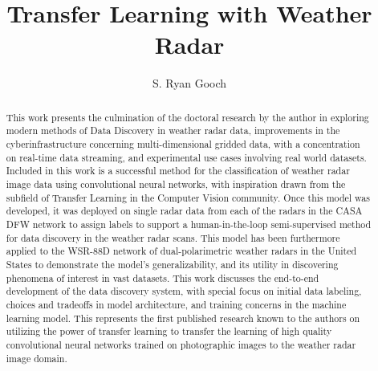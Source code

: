 \documentclass[]{csuthesis} %
\title[Transfer Learning with Weather Radar]{Transfer Learning with Weather Radar}
\author{S. Ryan Gooch}
\begin{document}
\frontmatter

\begin{abstract}
This work presents the culmination of the doctoral research by the author in exploring modern methods of Data Discovery in weather radar data, improvements in the cyberinfrastructure concerning multi-dimensional gridded data, with a concentration on real-time data streaming, and experimental use cases involving real world datasets. 
Included in this work is a successful method for the classification of weather radar image data using convolutional neural networks, with inspiration drawn from the subfield of Transfer Learning in the Computer Vision community. 
Once this model was developed, it was deployed on single radar data from each of the radars in the CASA DFW network to assign labels to support a human-in-the-loop semi-supervised method for data discovery in the weather radar scans. 
This model has been furthermore applied to the WSR-88D network of dual-polarimetric weather radars in the United States to demonstrate the model’s generalizability, and its utility in discovering phenomena of interest in vast datasets. 
This work discusses the end-to-end development of the data discovery system, with special focus on initial data labeling, choices and tradeoffs in model architecture, and training concerns in the machine learning model. 
This represents the first published research known to the authors on utilizing the power of transfer learning to transfer the learning of high quality convolutional neural networks trained on photographic images to the weather radar image domain.
\end{abstract}

%
\end{document}
